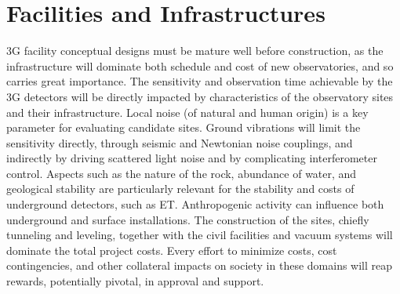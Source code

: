 
\chapter{Facilities and Infrastructures}
\label{sec:Fac_Inf}
\vspace{1cm}
3G facility conceptual designs must be mature well before construction, as the infrastructure will dominate both schedule and cost of new observatories, and so carries great importance. 
The sensitivity and observation time achievable by the 3G detectors will be directly impacted by characteristics of the observatory sites and their infrastructure. 
Local noise (of natural and human origin) is a key parameter for evaluating candidate sites. Ground vibrations will limit the sensitivity directly, through seismic and Newtonian noise couplings, and indirectly by driving scattered light noise and by complicating interferometer control. 
Aspects such as the nature of the rock, abundance of water, and geological stability are particularly relevant for the stability and costs of underground detectors, such as ET. 
Anthropogenic activity can influence both underground and surface installations. The construction of the sites, chiefly tunneling and leveling, together with the civil facilities and vacuum systems will dominate the total project costs. 
Every effort to minimize costs, cost contingencies, and other collateral impacts on society in these domains will reap rewards, potentially pivotal, in approval and support.

% 

